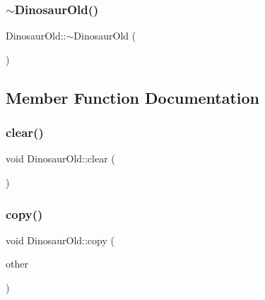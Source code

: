 \mbox{\label{classDinosaurOld_a56ecd77ce7904b40c29a9f795084bc6a}} 
\subsubsection{\texorpdfstring{$\sim$\+Dinosaur\+Old()}{~DinosaurOld()}}
{\footnotesize\ttfamily Dinosaur\+Old\+::$\sim$\+Dinosaur\+Old (\begin{DoxyParamCaption}{ }\end{DoxyParamCaption})}



\subsection{Member Function Documentation}
\mbox{\label{classDinosaurOld_a6b66361d0bf89eaaaf4058bd5d578a2a}} 
\subsubsection{\texorpdfstring{clear()}{clear()}}
{\footnotesize\ttfamily void Dinosaur\+Old\+::clear (\begin{DoxyParamCaption}{ }\end{DoxyParamCaption})\hspace{0.3cm}{\ttfamily [private]}}

\mbox{\label{classDinosaurOld_aa0cbaaaacd72099602180898b1634593}} 
\subsubsection{\texorpdfstring{copy()}{copy()}\hspace{0.1cm}{\footnotesize\ttfamily [1/2]}}
{\footnotesize\ttfamily void Dinosaur\+Old\+::copy (\begin{DoxyParamCaption}\item[{const \hyperlink{classDinosaurOld}{Dinosaur\+Old} \&}]{other }\end{DoxyParamCaption})\hspace{0.3cm}{\ttfamily [private]}}

